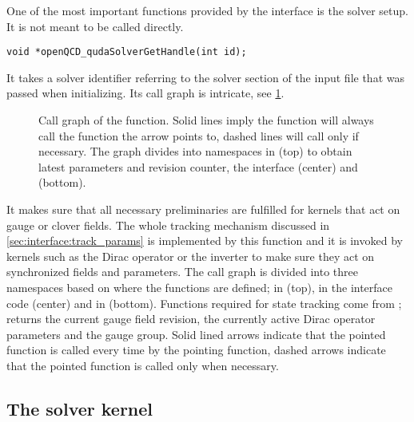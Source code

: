 One of the most important functions provided by the interface is the solver setup.
It is not meant to be called directly.
\begin{verbatim}
void *openQCD_qudaSolverGetHandle(int id);
\end{verbatim}
It takes a solver identifier referring to the solver section of the input file that was passed when initializing.
Its call graph is intricate, see \cref{fig:call_graph}.
\begin{figure}
  
  \caption{Call graph of the  function. Solid lines imply the function will always call the function the arrow points to, dashed lines will call only if necessary. The graph divides into namespaces in \openqxd (top) to obtain latest parameters and revision counter, the interface (center) and \quda (bottom).}
  \label{fig:call_graph}
\end{figure}
It makes sure that all necessary preliminaries are fulfilled for kernels that act on gauge or clover fields.
The whole tracking mechanism discussed in \cref{sec:interface:track_params} is implemented by this function and it is invoked by kernels such as the Dirac operator or the inverter to make sure they act on synchronized fields and parameters.
The call graph is divided into three namespaces based on where the functions are defined; in \openqxd (top), in the interface code (center) and in \quda (bottom).
Functions required for state tracking come from \openqxd;  returns the current gauge field revision,  the currently active Dirac operator parameters and  the gauge group.
Solid lined arrows indicate that the pointed function is called every time by the pointing function, dashed arrows indicate that the pointed function is called only when necessary.

\subsection{The solver kernel}
\label{sec:interface:solver:simple}


